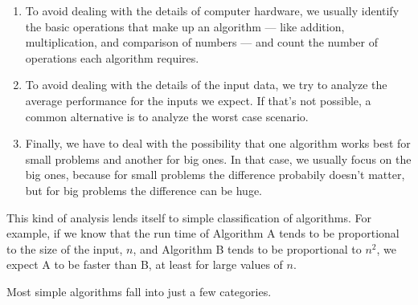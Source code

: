 \documentclass[12pt]{book}
\theoremstyle{exercise}
\newcommand{\java}{\verb}%}
\begin{document}
\begin{enumerate}

\item
  To avoid dealing with the details of computer hardware, we usually
  identify the basic operations that make up an algorithm --- like
  addition, multiplication, and comparison of numbers --- and count the
  number of operations each algorithm requires.

\item
  To avoid dealing with the details of the input data, we try to analyze
  the average performance for the inputs we expect. If that's not
  possible, a common alternative is to analyze the worst case scenario.

\item
  Finally, we have to deal with the possibility that one algorithm works
  best for small problems and another for big ones. In that case, we
  usually focus on the big ones, because for small problems the difference
  probabily doesn't matter, but for big problems the difference can
  be huge.

\end{enumerate}

This kind of analysis lends itself to simple classification of
algorithms. For example, if we know that the run time of Algorithm A
tends to be proportional to the size of the input, $n$,
and Algorithm B tends to be proportional to $n^2$, we
expect A to be faster than B, at least for large values of $n$.

Most simple algorithms fall into just a few categories.

\end{document}
